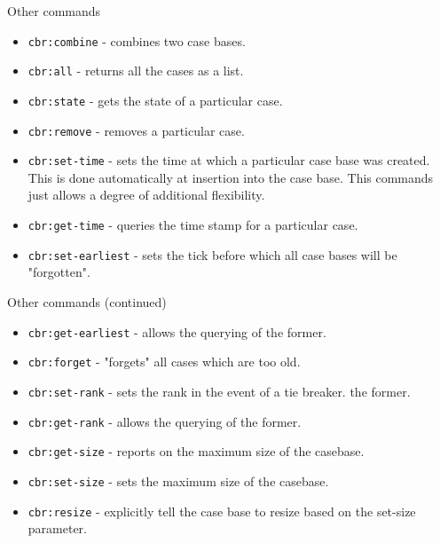 \documentclass[usenames,dvipsnames,10pt]{beamer} %
\begin{document}
\begin{frame}{Other commands}

    \begin{itemize}
        \item {\color{green}\texttt{cbr:combine}} - combines two case bases.
        \item {\color{green}\texttt{cbr:all}} - returns all the cases as a list.
        \item {\color{green}\texttt{cbr:state}} - gets the state of a particular case.
        \item {\color{green}\texttt{cbr:remove}} - removes a particular case.
        \item {\color{green}\texttt{cbr:set-time}} - sets the time at which a
            particular case base was created. This is done automatically at
            insertion into the case base. This commands just allows a degree of
            additional flexibility.
        \item {\color{green}\texttt{cbr:get-time}} - queries  the time stamp 
            for a particular case.
        \item {\color{green}\texttt{cbr:set-earliest}} - sets the tick before
            which all case bases will be "forgotten".
     \end{itemize}
\end{frame}

\begin{frame}{Other commands (continued)}

    \begin{itemize}
       \item {\color{green}\texttt{cbr:get-earliest}} - allows the querying of
            the former.
        \item {\color{green}\texttt{cbr:forget}} - "forgets" all cases which are too old.
        \item {\color{green}\texttt{cbr:set-rank}} - sets the rank in the event of a tie breaker.
            the former.
        \item {\color{green}\texttt{cbr:get-rank}} - allows the querying of
            the former.
        \item {\color{green}\texttt{cbr:get-size}} - reports on the maximum
            size of the casebase.
        \item {\color{green}\texttt{cbr:set-size}} - sets the maximum size of
            the casebase.
        \item {\color{green}\texttt{cbr:resize}} - explicitly tell the case
            base to resize based on the set-size parameter.
    \end{itemize}

\end{frame}
\end{document}
